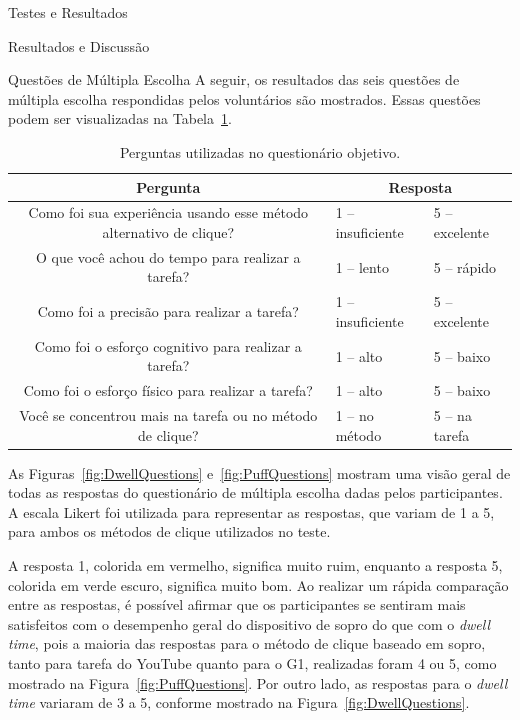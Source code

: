\begin{chapter}{Testes e Resultados}
\begin{section}{Resultados e Discussão}
\begin{subsection}{Questões de Múltipla Escolha}
A seguir, os resultados das seis questões de múltipla escolha respondidas pelos
voluntários são mostrados. Essas questões podem ser visualizadas na
Tabela~\ref{tab:quest}.

\begin{table}[!h]
\centering
\small
\def\arraystretch{1.0}
\begin{tabular}{c|ll}
	\hline
	\hline
	 \textbf{Pergunta} &\multicolumn{2}{c}{\textbf{Resposta}} \\
	\hline
	 Como foi sua experiência usando esse método alternativo de clique? & 1 -- insuficiente        & 5 -- excelente   \\
	 O que você achou do tempo para realizar a tarefa?                  & 1 -- lento               & 5 -- rápido      \\
	 Como foi a precisão para realizar a tarefa?                        & 1 -- insuficiente        & 5 -- excelente   \\
	 Como foi o esforço cognitivo para realizar a tarefa?               & 1 -- alto                & 5 -- baixo       \\
	 Como foi o esforço físico para realizar a tarefa?                  & 1 -- alto                & 5 -- baixo       \\
	 Você se concentrou mais na tarefa ou no método de clique?          & 1 -- no método           & 5 -- na tarefa   \\
	\hline
	\hline
\end{tabular}
\caption{Perguntas utilizadas no questionário objetivo.}
\label{tab:quest}
\end{table}

As Figuras~\ref{fig:DwellQuestions} e~\ref{fig:PuffQuestions} mostram uma visão
geral de todas as respostas do questionário de múltipla escolha dadas pelos
participantes. A escala Likert foi utilizada para representar as respostas, que
variam de 1 a 5, para ambos os métodos de clique utilizados no teste.

A resposta 1, colorida em vermelho, significa muito ruim,
enquanto a resposta 5, colorida em verde escuro, significa muito bom. Ao
realizar um rápida comparação entre as respostas, é possível afirmar que os
participantes se sentiram mais satisfeitos com o desempenho geral do dispositivo
de sopro do que com o \textit{dwell time}, pois a maioria das respostas
para o método de clique baseado em sopro, tanto para tarefa do YouTube quanto
para o G1, realizadas foram 4
ou 5, como mostrado na Figura~\ref{fig:PuffQuestions}. Por outro lado, as 
respostas para o \textit{dwell time} variaram de 3 a 5, conforme mostrado na
Figura~\ref{fig:DwellQuestions}.  


\end{subsection}
\end{section}
\end{chapter}
